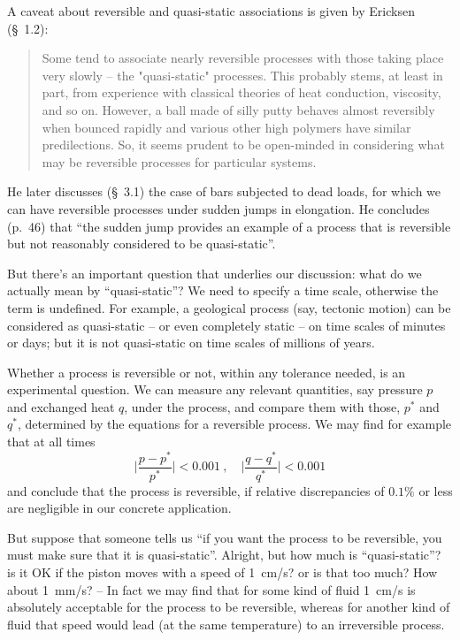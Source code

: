 \documentclass[a4paper,12pt,%
onecolumn,oneside,titlepage,%
british%
]{memoir}
\renewcommand*{\|}[1][]{\nonscript\:#1\vert\nonscript\:\mathopen{}}
\newcommand*{\sect}{\S}%
\begin{document}
A caveat about reversible and quasi-static associations is given by Ericksen (\sect~1.2):
\begin{quote}
  Some tend to associate nearly reversible processes with those taking place very slowly – the "quasi-static" processes. This probably stems, at least in part, from experience with classical theories of heat conduction, viscosity, and so on. However, a ball made of silly putty behaves almost reversibly when bounced rapidly and various other high polymers have similar predilections. So, it seems prudent to be open-minded in considering what may be reversible processes for particular systems.
\end{quote}
He later discusses (\sect~3.1) the case of bars subjected to dead loads, for which we can have reversible processes under sudden jumps in elongation. He concludes (p.~46) that \enquote{the sudden jump provides an example of a process that is reversible but not reasonably considered to be quasi-static}.

\medskip

But there's an important question that underlies our discussion: what do we actually mean by \enquote{quasi-static}? We need to specify a time scale, otherwise the term is undefined. For example, a geological process (say, tectonic motion) can be considered as quasi-static – or even completely static – on time scales of minutes or days; but it is not quasi-static on time scales of millions of years.

Whether a process is reversible or not, within any tolerance needed, is an experimental question. We can measure any relevant quantities, say pressure $p$ and exchanged heat $q$, under the process, and compare them with those, $p^*$ and $q^*$, determined by the equations for a reversible process. We may find for example that at all times
$$\biggl\lvert\frac{p - p^*}{p^*}\biggr\rvert < 0.001 \ ,
\quad
\biggl\lvert\frac{q - q^*}{q^*}\biggr\rvert < 0.001
$$
and conclude that the process is reversible, if relative discrepancies of $0.1\%$ or less are negligible in our concrete application.

But suppose that someone tells us \enquote{if you want the process to be reversible, you must make sure that it is quasi-static}. Alright, but how much is \enquote{quasi-static}? is it OK if the piston moves with a speed of 1~cm/s? or is that too much? How about 1~mm/s? – In fact we may find that for some kind of fluid 1~cm/s is absolutely acceptable for the process to be reversible, whereas for another kind of fluid that speed would lead (at the same temperature) to an irreversible process.
\end{document}
